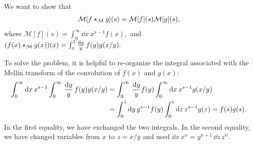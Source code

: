 





We want to show that
\begin{align}
    \mathcal{M}[f \star_{\mathcal M} g](s) = \mathcal{M}[f](s) \mathcal{M}[g](s)
    ,
\end{align}
where
\(
    \mathcal{M}[f](s) = \int_0^\infty \dd x\, x^{s-1} f(x)
    ,
\)
and
\(
    (f(x) \star_{\mathcal M} g(x))(x)
    =
    \int_x^1 \frac{\dd y}{y}\, f(y) g(x/y)
    .
\)

To solve the problem, it is helpful to re-organize the integral associated with the Mellin transform of the convolution of \(f(x)\) and \(g(x)\):
\begin{align}
    \int_0^\infty \dd x\, x^{s-1}
    \int_0^\infty \,\frac{\dd y}{y}\,
    f(y) g(x/y)
    &=
    \int_0^\infty \,\frac{\dd y}{y}
    f(y)
    \int_0^\infty \dd x\,
    x^{s-1} g(x/y)
    \\
    \notag
    &=
    \int_0^1 \dd y \, y^{s-1} f(y)
    \int_0^1 \dd z\, z^{s-1} g(z)
    =
    f(s) g(s)
    .
\end{align}
In the first equality, we have exchanged the two integrals. %
%
In the second equality, we have changed variables from \(x\) to \(z = x/y\) and used \(\dd x\, x^n = y^{n+1}\, \dd z\, z^n\).

